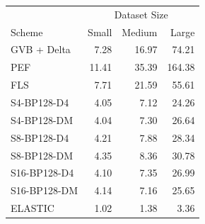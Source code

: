\begin{tabular}{lrrr}
\toprule
 & \multicolumn{3}{c}{Dataset Size} \\
Scheme & Small & Medium & Large \\
\midrule
GVB + Delta & 7.28 & 16.97 & 74.21 \\
PEF & 11.41 & 35.39 & 164.38 \\
FLS & 7.71 & 21.59 & 55.61 \\
S4-BP128-D4 & 4.05 & 7.12 & 24.26 \\
S4-BP128-DM & 4.04 & 7.30 & 26.64 \\
S8-BP128-D4 & 4.21 & 7.88 & 28.34 \\
S8-BP128-DM & 4.35 & 8.36 & 30.78 \\
S16-BP128-D4 & 4.10 & 7.35 & 26.99 \\
S16-BP128-DM & 4.14 & 7.16 & 25.65 \\
ELASTIC & 1.02 & 1.38 & 3.36 \\
\bottomrule
\end{tabular}
